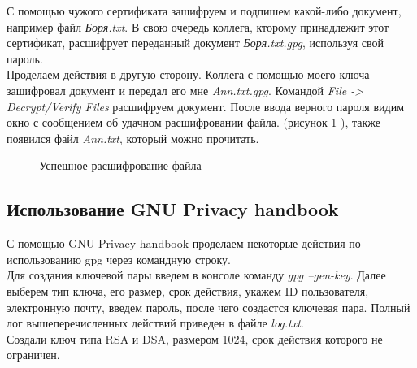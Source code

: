 \documentclass[10pt,a4paper]{report}
\begin{document}
С помощью чужого сертификата зашифруем и подпишем какой-либо документ, например файл \textit{Боря.txt}.  В свою очередь коллега, кторому принадлежит этот сертификат, расшифрует переданный документ \textit{Боря.txt.gpg}, используя свой пароль. \\
Проделаем действия в другую сторону. Коллега с помощью моего ключа зашифровал документ и передал его мне \textit{Ann.txt.gpg}. Командой \textit{File -> Decrypt/Verify Files} расшифруем документ. После ввода верного пароля видим окно с сообщением об удачном расшифровании файла. 
(рисунок \ref{ris:image16} ), также появился файл \textit{Ann.txt}, который можно прочитать. 
\begin{figure}[h]	
\caption{Успешное расшифрование файла}
\label{ris:image16}
\end{figure}

\subsection{Использование GNU Privacy handbook}
С помощью GNU Privacy handbook проделаем некоторые действия по использованию gpg через командную строку. \\
Для создания ключевой пары введем в консоле команду \textit{gpg --gen-key}. Далее выберем тип ключа, его размер, срок действия, укажем ID пользователя, электронную почту, введем пароль, после чего создастся ключевая пара. Полный лог вышеперечисленных действий приведен в файле \textit{log.txt}. \\
Создали ключ типа RSA и DSA, размером 1024, срок действия которого не ограничен. \\
 
\end{document}
